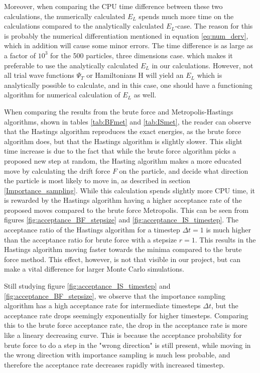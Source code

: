 \documentclass[norsk,a4paper,12pt]{article}
\begin{document}
Moreover, when comparing the CPU time difference between these two calculations, the numerically calculated $E_L$ spends much more time on the calculations compared to the analytically calculated $E_L$-case. The reason for this is probably the numerical differentiation mentioned in equation \ref{eq:num_derv}, which in addition will cause some minor errors. The time difference is as large as a factor of $10^3$ for the 500 particles, three dimensions case. which makes it preferable to use the analytically calculated $E_L$ in our calculations. However, not all trial wave functions $\Psi_T$ or Hamiltonians H will yield an $E_L$ which is analytically possible to calculate, and in this case, one should have a functioning algorithm for numerical calculation of $E_L$ as well.
\par 
\vspace{3mm}

When comparing the results from the brute force and Metropolis-Hastings algorithms, shown in tables \ref{tab:BFmet} and \ref{tab:ISmet}, the reader can observe that the Hastings algorithm reproduces the exact energies, as the brute force algorithm does, but that the Hastings algorithm is slightly slower. This slight time increase is due to the fact that while the brute force algorithm picks a proposed new step at random, the Hasting algorithm makes a more educated move by calculating the drift force $F$ on the particle, and decide what direction the particle is most likely to move in, as described in section \ref{Importance_sampling}. While this calculation spends slightly more CPU time, it is rewarded by the Hastings algorithm having a higher acceptance rate of the proposed moves compared to the brute force Metropolis. This can be seen from figures \ref{fig:acceptance_BF_stepsize} and \ref{fig:acceptance_IS_timestep}. The acceptance ratio of the Hastings algorithm for a timestep $\Delta t=1$ is much higher than the acceptance ratio for brute force with a stepsize $r=1$. This results in the Hastings algorithm moving faster towards the minima compared to the brute force method. This effect, however, is not that visible in our project, but can make a vital difference for larger Monte Carlo simulations.
\par 
\vspace{3mm}

Still studying figure \ref{fig:acceptance_IS_timestep} and \ref{fig:acceptance_BF_stepsize}, we observe that the importance sampling algorithm has a high acceptance rate for intermediate timesteps $\Delta t$, but the acceptance rate drops seemingly exponentially for higher timesteps. Comparing this to the brute force acceptance rate, the drop in the acceptance rate is more like a lineary decreasing curve. This is because the acceptance probability for brute force to do a step in the "wrong direction" is still present, while moving in the wrong direction with importance sampling is much less probable, and therefore the acceptance rate decreases rapidly with increased timestep.
\par 
\vspace{3mm}
\end{document}
